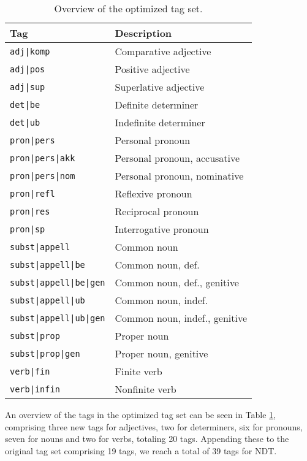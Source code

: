 \documentclass[11pt,a4paper]{article}
\begin{document}
\begin{table}
    \centering
    \smaller[0.5]
    \begin{tabular}{@{}ll@{}}
        \toprule
        \textbf{Tag} & \textbf{Description} \\
        \midrule
        \texttt{adj|komp} & Comparative adjective \\
        \texttt{adj|pos} & Positive adjective \\
        \texttt{adj|sup} & Superlative adjective \\
        \texttt{det|be} & Definite determiner \\
        \texttt{det|ub} & Indefinite determiner \\
        \texttt{pron|pers} & Personal pronoun \\
        \texttt{pron|pers|akk} & Personal pronoun, accusative \\
        \texttt{pron|pers|nom} & Personal pronoun, nominative \\
        \texttt{pron|refl} & Reflexive pronoun \\
        \texttt{pron|res} & Reciprocal pronoun \\
        \texttt{pron|sp} & Interrogative pronoun \\
        \texttt{subst|appell} & Common noun \\
        \texttt{subst|appell|be} & Common noun, def. \\
        \texttt{subst|appell|be|gen} & Common noun, def., genitive \\
        \texttt{subst|appell|ub} & Common noun, indef. \\
        \texttt{subst|appell|ub|gen} & Common noun, indef., genitive \\
        \texttt{subst|prop} & Proper noun \\
        \texttt{subst|prop|gen} & Proper noun, genitive \\
        \texttt{verb|fin} & Finite verb \\
        \texttt{verb|infin} & Nonfinite verb \\
        \bottomrule
    \end{tabular}
    \caption{Overview of the optimized tag set.}
    \label{optimizedtagset}
\end{table}

An overview of the tags in the optimized tag set can be seen in Table
\ref{optimizedtagset}, comprising three new tags for adjectives, two for
determiners, six for pronouns, seven for nouns and two for verbs, totaling 20
tags. Appending these to the original tag set comprising 19 tags, we reach a
total of 39 tags for NDT.
\end{document}
